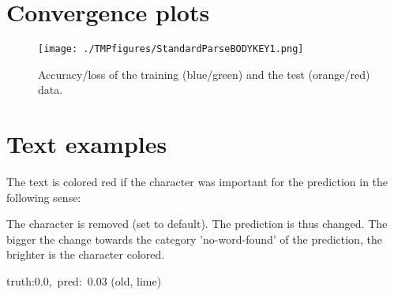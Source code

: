 \documentclass[a4paper,10pt,twoside]{article}
\begin{document}
        \section{Convergence plots}
\begin{figure}[H]
\begin{center}
\texttt{[image: ./TMPfigures/StandardParseBODYKEY1.png]}
\end{center}
\caption{Accuracy/loss of the training (blue/green) and the test (orange/red) data.}
\end{figure}
\section{Text examples}
The text is colored red if the character was important for the prediction in the following sense:


    The character is removed (set to default). The prediction is thus changed. 
    The bigger the change towards the category 'no-word-found' of the prediction, the brighter is the character colored. 
    \vspace{1cm}
    


    

 {\footnotesize {\color[rgb]{0.6, 0.6, 0.6}truth:0.0,~pred:~0.03}} (old, lime)\hrulefill
\end{document}
